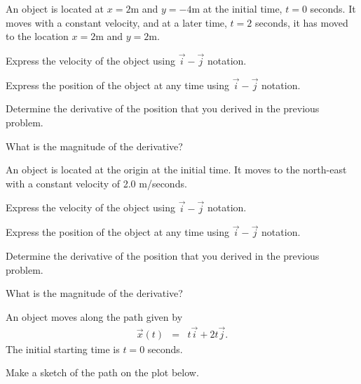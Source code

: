 
\begin{problem}
\item An object is located at $x=2$m and $y=-4$m at the initial time,
  $t=0$ seconds. It moves with a constant velocity, and at a later
  time, $t=2$ seconds, it has moved to the location $x=2$m and
  $y=2$m. 
  \begin{subproblem}
  \item Express the velocity of the object using $\vec{i}-\vec{j}$
    notation.  
    \vfill
  \item Express the position of the object at any time using
    $\vec{i}-\vec{j}$ notation.
    \vfill
  \item Determine the derivative of the position that you derived in
    the previous problem.
    \vfill
  \item What is the magnitude of the derivative?
    \vfill
  \end{subproblem}

  \clearpage

\item An object is located at the origin at the initial time. It moves
  to the north-east with a constant velocity of 2.0 m/seconds. 

  \begin{subproblem}
  \item Express the velocity of the object using $\vec{i}-\vec{j}$
    notation.  
    \vfill
  \item Express the position of the object at any time using
    $\vec{i}-\vec{j}$ notation.
    \vfill
  \item Determine the derivative of the position that you derived in
    the previous problem.
    \vfill
  \item What is the magnitude of the derivative?
    \vfill
  \end{subproblem}

  \clearpage

\item An object moves along the path given by
  \begin{eqnarray*}
    \vec{x}(t) & = & t \vec{i} + 2 t \vec{j}.
  \end{eqnarray*}
  The initial starting time is $t=0$ seconds.

  \begin{subproblem}
  \item Make a sketch of the path on the plot below.


\end{subproblem}
\end{problem}
